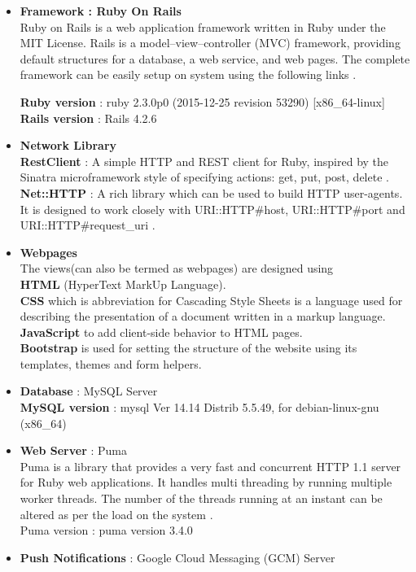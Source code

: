 \begin{itemize}

\item \textbf{Framework : Ruby On Rails}\\
Ruby on Rails is a web application framework written in Ruby under the MIT License. Rails is a model–view–controller (MVC) framework, providing default structures for a database, a web service, and web pages. The complete framework can be easily setup on system using the following links \cite{Setup43:online} \cite{RVM:R7:online}.

\textbf{Ruby version} : ruby 2.3.0p0 (2015-12-25 revision 53290) [x86\_64-linux] \\
\textbf{Rails version} : Rails 4.2.6

\item \textbf{Network Library} \\
\textbf{RestClient} : A simple HTTP and REST client for Ruby, inspired by the Sinatra microframework style of specifying actions: get, put, post, delete \cite{GitHu91:online}.\\
\textbf{Net::HTTP} : A rich library which can be used to build HTTP user-agents. It is designed to work closely with URI::HTTP\#host, URI::HTTP\#port and URI::HTTP\#request\_uri  \cite{Class28:online}.

\item \textbf{Webpages} \\
The views(can also be termed as webpages) are designed using \\
\textbf{HTML} (HyperText MarkUp Language). \\
\textbf{CSS} which is abbreviation for Cascading Style Sheets  is a language used for describing the presentation of a document written in a markup language. \\ 
\textbf{JavaScript} to add client-side behavior to HTML pages. \\
\textbf{Bootstrap} is used for setting the structure of the website using its templates, themes and form helpers.

\item \textbf{Database} : MySQL Server \\ 
\textbf{MySQL version} : mysql  Ver 14.14 Distrib 5.5.49, for debian-linux-gnu (x86\_64)
\item \textbf{Web Server} :  Puma\\
Puma is a library that provides a very fast and concurrent HTTP 1.1 server for Ruby web applications. It handles multi threading by running multiple worker threads. The number of the threads running at an instant can be altered as per the load on the system \cite{AMode24:online}.\\
Puma version : puma version 3.4.0

\item \textbf{Push Notifications} : Google Cloud Messaging (GCM) Server
\end{itemize}

